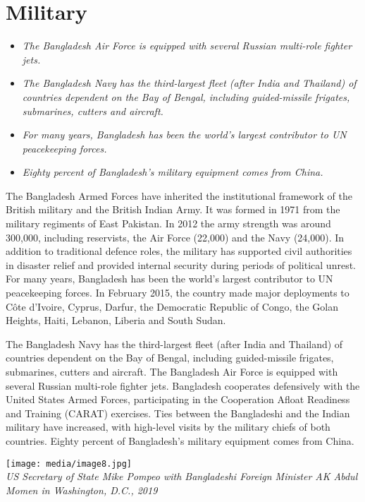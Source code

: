 \section{Military}\label{military}

\begin{itemize}
\item
  \emph{The Bangladesh Air Force is equipped with several Russian
  multi-role fighter jets.}
\item
  \emph{The Bangladesh Navy has the third-largest fleet (after India and
  Thailand) of countries dependent on the Bay of Bengal, including
  guided-missile frigates, submarines, cutters and aircraft.}
\item
  \emph{For many years, Bangladesh has been the world's largest
  contributor to UN peacekeeping forces.}
\item
  \emph{Eighty percent of Bangladesh's military equipment comes from
  China.}
\end{itemize}

The Bangladesh Armed Forces have inherited the institutional framework
of the British military and the British Indian Army. It was formed in
1971 from the military regiments of East Pakistan. In 2012 the army
strength was around 300,000, including reservists, the Air Force
(22,000) and the Navy (24,000). In addition to traditional defence
roles, the military has supported civil authorities in disaster relief
and provided internal security during periods of political unrest. For
many years, Bangladesh has been the world's largest contributor to UN
peacekeeping forces. In February 2015, the country made major
deployments to Côte d'Ivoire, Cyprus, Darfur, the Democratic Republic of
Congo, the Golan Heights, Haiti, Lebanon, Liberia and South Sudan.

The Bangladesh Navy has the third-largest fleet (after India and
Thailand) of countries dependent on the Bay of Bengal, including
guided-missile frigates, submarines, cutters and aircraft. The
Bangladesh Air Force is equipped with several Russian multi-role fighter
jets. Bangladesh cooperates defensively with the United States Armed
Forces, participating in the Cooperation Afloat Readiness and Training
(CARAT) exercises. Ties between the Bangladeshi and the Indian military
have increased, with high-level visits by the military chiefs of both
countries. Eighty percent of Bangladesh's military equipment comes from
China.

\texttt{[image: media/image8.jpg]}\\
\emph{US Secretary of State Mike Pompeo with Bangladeshi Foreign
Minister AK Abdul Momen in Washington, D.C., 2019}

